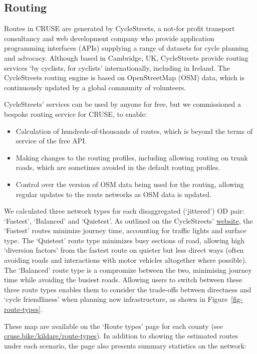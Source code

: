 \documentclass[
  super,
  preprint,
  3p]{elsarticle}
\providecommand{\tightlist}{%
  \setlength{\itemsep}{0pt}\setlength{\parskip}{0pt}}\usepackage{longtable,booktabs,array}
\begin{document}
\subsection{Routing}\label{routing}

Routes in CRUSE are generated by CycleStreets, a not-for profit
transport consultancy and web development company who provide
application programming interfaces (APIs) supplying a range of datasets
for cycle planning and advocacy. Although based in Cambridge, UK,
CycleStreets provide routing services `by cyclists, for cyclists'
internationally, including in Ireland. The CycleStreets routing engine
is based on OpenStreetMap (OSM) data, which is continuously updated by a
global community of volunteers.

CycleStreets' services can be used by anyone for free, but we
commissioned a bespoke routing service for CRUSE, to enable:

\begin{itemize}
\tightlist
\item
  Calculation of hundreds-of-thousands of routes, which is beyond the
  terms of service of the free API.
\item
  Making changes to the routing profiles, including allowing routing on
  trunk roads, which are sometimes avoided in the default routing
  profiles.
\item
  Control over the version of OSM data being used for the routing,
  allowing regular updates to the route networks as OSM data is updated.
\end{itemize}

We calculated three network types for each disaggregated (`jittered') OD
pair: `Fastest', `Balanced' and `Quietest'. As outlined on the
CycleStreets'
\href{https://www.cyclestreets.net/help/journey/howitworks/}{website},
the `Fastest' routes minimize journey time, accounting for traffic
lights and surface type. The `Quietest' route type minimizes busy
sections of road, allowing high `diversion factors' from the fastest
route on quieter but less direct ways (often avoiding roads and
interactions with motor vehicles altogether where possible). The
`Balanced' route type is a compromize between the two, minimising
journey time while avoiding the busiest roads. Allowing users to switch
between these three route types enables them to consider the trade-offs
between directness and `cycle friendliness' when planning new
infrastructure, as shown in Figure~\ref{fig-route-types}.

These map are available on the `Route types' page for each county (see
\href{https://cruse.bike/kildare/route-types}{cruse.bike/kildare/route-types}).
In addition to showing the estimated routes under each scenario, the
page also presents summary statistics on the network:
\end{document}
